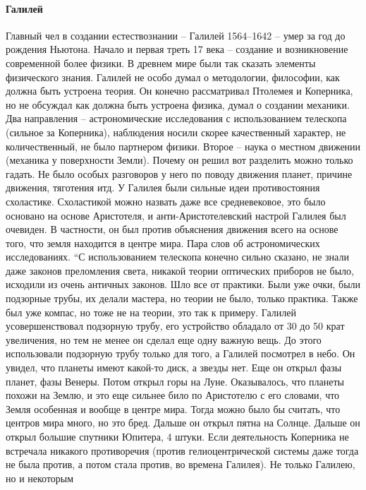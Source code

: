 \documentclass[a4paper, 12pt]{article}
\begin{document}
\paragraph{Галилей}
Главный чел в создании естествознании -- Галилей 1564--1642 -- умер за 
год до рождения Ньютона. Начало и первая треть 17 века -- создание 
и возникновение современной более физики. В древнем мире были так 
сказать элементы физического знания. Галилей не особо думал 
о методологии, философии, как должна быть устроена теория. Он конечно 
рассматривал Птолемея и Коперника, но не обсуждал как должна быть 
устроена физика, думал о создании механики. Два направления -- 
астрономические исследования с использованием телескопа (сильное за 
Коперника), наблюдения носили скорее качественный характер, не 
количественный, не было партнером физики. Второе -- наука о местном 
движении (механика у поверхности Земли). Почему он решил вот разделить 
можно только гадать. Не было особых разговоров у него по поводу движения 
планет, причине движения, тяготения итд. У Галилея были сильные идеи 
противостояния схоластике. Схоластикой можно назвать даже все 
средневековое, это было основано на основе Аристотеля, 
и анти-Аристотелевский настрой Галилея был очевиден. В частности, он был 
против объяснения движения всего на основе того, что земля находится 
в центре мира. Пара слов об астрономических исследованиях. ``С 
использованием телескопа конечно сильно сказано, не знали даже законов 
преломления света, никакой теории оптических приборов не было, исходили 
из очень античных законов. Шло все от практики. Были уже очки, были 
подзорные трубы, их делали мастера, но теории не было, только практика. 
Также был уже компас, но тоже не на теории, это так к примеру. Галилей 
усовершенствовал подзорную трубу, его устройство обладало от 30 до 50 
крат увеличения, но тем не менее он сделал еще одну важную вещь. До 
этого использовали подзорную трубу только для того, а Галилей посмотрел 
в небо. Он увидел, что планеты имеют какой-то диск, а звезды нет. Еще он 
открыл фазы планет, фазы Венеры. Потом открыл горы на Луне. Оказывалось, 
что планеты похожи на Землю, и это еще сильнее било по Аристотелю с его 
словами, что Земля особенная и вообще в центре мира. Тогда можно было бы 
считать, что центров мира много, но это бред. Дальше он открыл пятна на 
Солнце. Дальше он открыл большие спутники Юпитера, 4 штуки. Если 
деятельность Коперника не встречала никакого противоречия (против 
гелиоцентрической системы даже тогда не была против, а потом стала 
против, во времена Галилея). Не только Галилею, но и некоторым 
\end{document}
